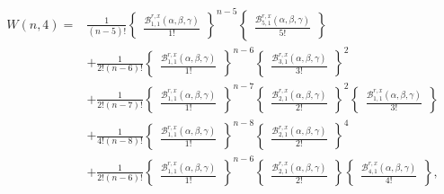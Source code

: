 \documentclass[12pt]{amsart}
\newtheorem{proof 1}{proof 1}
\begin{document}
\begin{align*}W(n,4)=&\frac{1}{(n-5)!}\begin{Bmatrix}
		\frac{\mathcal{B}^{r,x}_{1,1}(\alpha,\beta,\gamma)}{1!}
	\end{Bmatrix}^{n-5}\begin{Bmatrix}
		\frac{\mathcal{B}^{r,x}_{5,1}(\alpha,\beta,\gamma)}{5!}
	\end{Bmatrix}\\&+\frac{1}{2!(n-6)!}\begin{Bmatrix}
		\frac{\mathcal{B}^{r,x}_{1,1}(\alpha,\beta,\gamma)}{1!}
	\end{Bmatrix}^{n-6}\begin{Bmatrix}
		\frac{\mathcal{B}^{r,x}_{3,1}(\alpha,\beta,\gamma)}{3!}
	\end{Bmatrix}^2\\&+\frac{1}{2!(n-7)!}\begin{Bmatrix}
		\frac{\mathcal{B}^{r,x}_{1,1}(\alpha,\beta,\gamma)}{1!}
	\end{Bmatrix}^{n-7}\begin{Bmatrix}
		\frac{\mathcal{B}^{r,x}_{2,1}(\alpha,\beta,\gamma)}{2!}
	\end{Bmatrix}^2\begin{Bmatrix}
		\frac{\mathcal{B}^{r,x}_{1,1}(\alpha,\beta,\gamma)}{3!}
	\end{Bmatrix}\\&+\frac{1}{4!(n-8)!}\begin{Bmatrix}
		\frac{\mathcal{B}^{r,x}_{1,1}(\alpha,\beta,\gamma)}{1!}
	\end{Bmatrix}^{n-8}\begin{Bmatrix}
		\frac{\mathcal{B}^{r,x}_{2,1}(\alpha,\beta,\gamma)}{2!}
	\end{Bmatrix}^4\\&+
	\frac{1}{2!(n-6)!}\begin{Bmatrix}
		\frac{\mathcal{B}^{r,x}_{1,1}(\alpha,\beta,\gamma)}{1!}
	\end{Bmatrix}^{n-6}\begin{Bmatrix}
		\frac{\mathcal{B}^{r,x}_{2,1}(\alpha,\beta,\gamma)}{2!}
	\end{Bmatrix}\begin{Bmatrix}
		\frac{\mathcal{B}^{r,x}_{4,1}(\alpha,\beta,\gamma)}{4!}
	\end{Bmatrix},
\end{align*}
\end{document}
